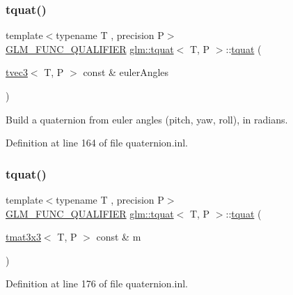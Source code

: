 \subsubsection{\texorpdfstring{tquat()}{tquat()}\hspace{0.1cm}{\footnotesize\ttfamily [9/13]}}
{\footnotesize\ttfamily template$<$typename T , precision P$>$ \\
\mbox{\hyperlink{setup_8hpp_a33fdea6f91c5f834105f7415e2a64407}{G\+L\+M\+\_\+\+F\+U\+N\+C\+\_\+\+Q\+U\+A\+L\+I\+F\+I\+ER}} \mbox{\hyperlink{structglm_1_1tquat}{glm\+::tquat}}$<$ T, P $>$\+::\mbox{\hyperlink{structglm_1_1tquat}{tquat}} (\begin{DoxyParamCaption}\item[{\mbox{\hyperlink{structglm_1_1tvec3}{tvec3}}$<$ T, P $>$ const \&}]{euler\+Angles }\end{DoxyParamCaption})}



Build a quaternion from euler angles (pitch, yaw, roll), in radians. 



Definition at line 164 of file quaternion.\+inl.

\mbox{\label{structglm_1_1tquat_a56ea9f0ac327fc40f99821fd8e0816f8}} 
\subsubsection{\texorpdfstring{tquat()}{tquat()}\hspace{0.1cm}{\footnotesize\ttfamily [10/13]}}
{\footnotesize\ttfamily template$<$typename T , precision P$>$ \\
\mbox{\hyperlink{setup_8hpp_a33fdea6f91c5f834105f7415e2a64407}{G\+L\+M\+\_\+\+F\+U\+N\+C\+\_\+\+Q\+U\+A\+L\+I\+F\+I\+ER}} \mbox{\hyperlink{structglm_1_1tquat}{glm\+::tquat}}$<$ T, P $>$\+::\mbox{\hyperlink{structglm_1_1tquat}{tquat}} (\begin{DoxyParamCaption}\item[{\mbox{\hyperlink{structglm_1_1tmat3x3}{tmat3x3}}$<$ T, P $>$ const \&}]{m }\end{DoxyParamCaption})}



Definition at line 176 of file quaternion.\+inl.

\mbox{\label{structglm_1_1tquat_a738e6d5bcc5a75cca8ac119edafaeafa}} 

